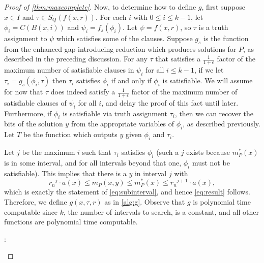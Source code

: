 \documentclass[]{article}
\theoremstyle{plain}
\theoremstyle{definition}
\begin{document}
\begin{proof}[Proof of \autoref{thm:maxcomplete}]
  Now, to determine how to define $g$, first suppose $x \in I$ and $\tau \in S_Q(f(x, r))$.
  For each $i$ with $0 \leq i \leq k - 1$, let $\phi_i = C(B(x, i))$ and $\psi_i = f_s(\phi_i)$.
  Let $\psi = f(x, r)$, so $\tau$ is a truth assignment to $\psi$ which satisfies some of the clauses.
  Suppose $g_s$ is the function from the enhanced gap-introducing reduction which produces solutions for $P$, as described in the preceding discussion.
  For any $\tau$ that satisfies a $\frac{1}{1 + \epsilon}$ factor of the maximum number of satisfiable clauses in $\psi_i$ for all $i \leq k - 1$, if we let $\tau_i = g_s(\phi_i, \tau)$ then $\tau_i$ satisfies $\phi_i$ if and only if $\phi_i$ is satisfiable.
  We will assume for now that $\tau$ does indeed satisfy a $\frac{1}{1 + \epsilon}$ factor of the maximum number of satisfiable clauses of $\psi_i$ for all $i$, and delay the proof of this fact until later.
  Furthermore, if $\phi_i$ is satisfiable via truth assignment $\tau_i$, then we can recover the bits of the solution $y$ from the appropriate variables of $\phi_i$, as described previously.
  Let $T$ be the function which outputs $y$ given $\phi_i$ and $\tau_i$.

  Let $j$ be the maximum $i$ such that $\tau_i$ satisfies $\phi_i$ (such a $j$ exists because $m^*_P(x)$ is in some interval, and for all intervals beyond that one, $\phi_i$ must not be satisfiable).
  This implies that there is a $y$ in interval $j$ with
  \begin{equation*}
    {r_n}^j \cdot a(x) \leq m_P(x, y) \leq m^*_P(x) \leq {r_n}^{j + 1} \cdot a(x),
  \end{equation*}
  which is exactly the statement of \autoref{eq:subinterval}, and hence \autoref{eq:result} follows.
  Therefore, we define $g(x, \tau, r)$ as in \autoref{alg:g}.
  Observe that $g$ is polynomial time computable since $k$, the number of intervals to search, is a constant, and all other functions are polynomial time computable.
  \begin{algorithm}
    \caption{Deterministic polynomial time algorithm that computes a $r_n$-approximate solution for $x$%
      \label{alg:g}}
    \begin{algorithmic}
      \Statex{}
      :
        \EndFor
         \\
        \hspace{1.5em}
      \EndFunction
    \end{algorithmic}
  \end{algorithm}


\end{proof}
\end{document}
